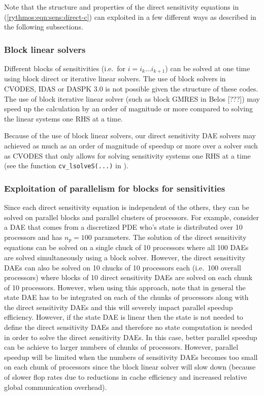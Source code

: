 \documentclass[pdf,ps2pdf,11pt]{SANDreport}
\begin{document}
Note that the structure and properties of the direct sensitivity equations in
(\ref{rythmos:eqn:sens:direct-c}) can exploited in a few different ways
as described in the following subsections.

\subsubsection{Block linear solvers}

Different blocks of sensitivities (i.e.\ for $i = i_k {}\ldots i_{k+1}$) can
be solved at one time using block direct or iterative linear solvers.  The use
of block solvers in CVODES, IDAS or DASPK 3.0 is not possible given the
structure of these codes.  The use of block iterative linear solver (such as
block GMRES in Belos [???])  may speed up the calculation by an order of
magnitude or more compared to solving the linear systems one RHS at a time.

Because of the use of block linear solvers, our direct sensitivity DAE solvers
may achieved as much as an order of magnitude of speedup or more over a solver
such as CVODES that only allows for solving sensitivity systems one RHS at a
time (see the function {}\texttt{cv\_lsolveS(...)} in
{}\cite{cvodes-users-guide}).

\subsubsection{Exploitation of parallelism for blocks for sensitivities}

Since each direct sensitivity equation is independent of the others, they can
be solved on parallel blocks and parallel clusters of processors.  For
example, consider a DAE that comes from a discretized PDE who's state is
distributed over 10 processors and has $n_p=100$ parameters.  The solution of
the direct sensitivity equations can be solved on a single chuck of 10
processors where all 100 DAEs are solved simultaneously using a block solver.
However, the direct sensitivity DAEs can also be solved on 10 chucks of 10
processors each (i.e.\ 100 overall processors) where blocks of 10 direct
sensitivity DAEs are solved on each chunk of 10 processors.  However, when
using this approach, note that in general the state DAE has to be integrated
on each of the chunks of processors along with the direct sensitivity DAEs and
this will severely impact parallel speedup efficiency.  However, if the state
DAE is linear then the state is not needed to define the direct sensitivity
DAEs and therefore no state computation is needed in order to solve the direct
sensitivity DAEs.  In this case, better parallel speedup can be achieve to
larger numbers of chunks of processors.  However, parallel speedup will be
limited when the numbers of sensitivity DAEs becomes too small on each chunk
of processors since the block linear solver will slow down (because of slower
flop rates due to reductions in cache efficiency and increased relative global
communication overhead).
\end{document}
